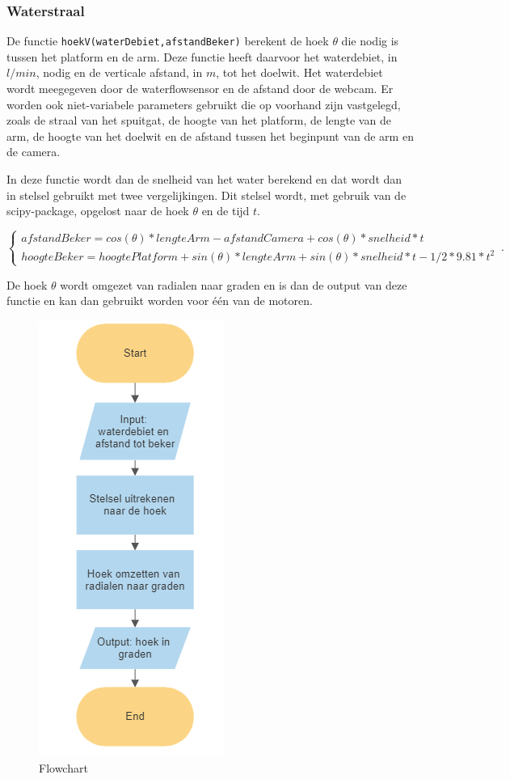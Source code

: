 \documentclass[kulak]{kulakarticle} %
\begin{document}
\subsubsection{Waterstraal}
		De functie \verb*|hoekV(waterDebiet,afstandBeker)| berekent de hoek \(\theta\)  die nodig is tussen het platform en de arm. Deze functie heeft daarvoor het waterdebiet, in \(l/min\), nodig en de verticale afstand, in \(m\), tot het doelwit. Het waterdebiet wordt meegegeven door de waterflowsensor en de afstand door de webcam. Er worden ook niet-variabele parameters gebruikt die op voorhand zijn vastgelegd, zoals de straal van het spuitgat, de hoogte van het platform, de lengte van de arm, de hoogte van het doelwit en de afstand tussen het beginpunt van de arm en de camera. 

In deze functie wordt dan de snelheid van het water berekend en dat wordt dan in stelsel gebruikt met twee vergelijkingen. Dit stelsel wordt, met gebruik van de scipy-package, opgelost naar de hoek \(\theta\) en de tijd \(t\).

\begin{equation}
	\begin{cases}
		afstandBeker  = cos(\theta )*lengteArm - afstandCamera + cos(\theta )*snelheid*t \\ 
		hoogteBeker  =  hoogtePlatform + sin(\theta )*lengteArm + sin(\theta )*snelheid*t - 1/2*9.81*t^2
	\end{cases}\,.
\end{equation}

De hoek \(\theta\) wordt omgezet van radialen naar graden en is dan de output van deze functie en kan dan gebruikt worden voor één van de motoren.

\begin{figure} [!h]
	\includegraphics[width = 0.4 \textwidth]{flowchart_hoekV}
	\caption{Flowchart }
\end{figure}
\end{document}
